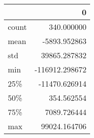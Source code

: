 \begin{tabular}{lr}
\toprule
{} &              0 \\
\midrule
count &     340.000000 \\
mean  &   -5893.952863 \\
std   &   39865.287832 \\
min   & -116912.298672 \\
25\%   &  -11470.626914 \\
50\%   &     354.562554 \\
75\%   &    7089.726444 \\
max   &   99024.164706 \\
\bottomrule
\end{tabular}
